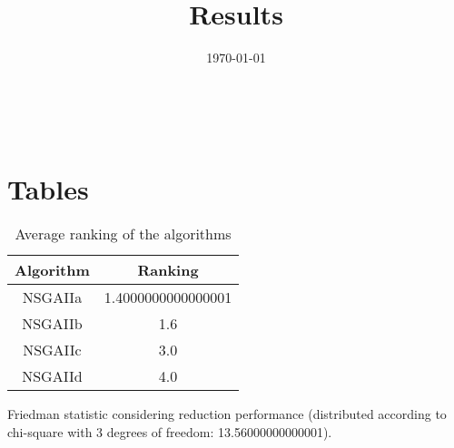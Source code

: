 \documentclass{article}
\title{Results}
\author{}
\date{\today}
\begin{document}
\oddsidemargin 0in \topmargin 0in\maketitle
\
\section{Tables}
\begin{table}[!htp]
\centering
\caption{Average ranking of the algorithms}
\begin{tabular}{c|c}
Algorithm&Ranking\\
\hline
NSGAIIa&1.4000000000000001\\
NSGAIIb&1.6\\
NSGAIIc&3.0\\
NSGAIId&4.0\\
\end{tabular}
\end{table}


Friedman statistic considering reduction performance (distributed according to chi-square with 3 degrees of freedom: 13.56000000000001).
\end{document}
